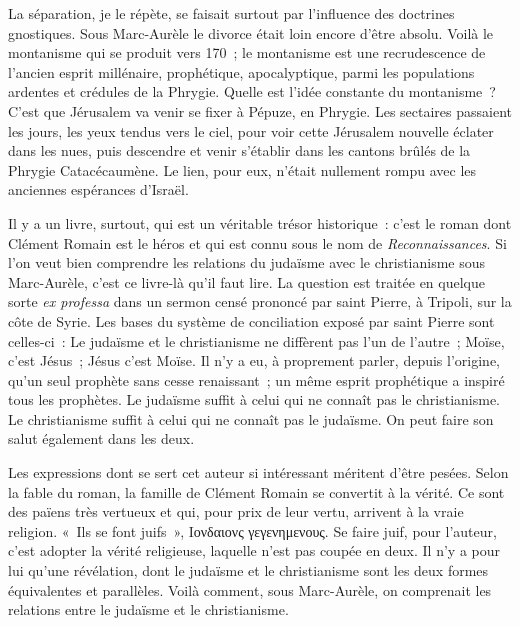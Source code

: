 \documentclass[french,twoside]{book} %
\newcommand\orgName[1]{#1}
\newcommand\persName[1]{#1}
\newcommand\placeName[1]{#1}
\begin{document}
La séparation, je le répète, se faisait surtout par l’influence des doctrines gnostiques. Sous {\persName Marc-Aurèle} le divorce était loin encore d’être absolu. Voilà le montanisme qui se produit vers 170 ; le montanisme est une recrudescence de l’ancien esprit millénaire, prophétique, apocalyptique, parmi les populations ardentes et crédules de la {\placeName Phrygie}. Quelle est l’idée constante du montanisme ? C’est que {\orgName Jérusalem} va venir se fixer à {\placeName Pépuze}, en {\placeName Phrygie}. Les sectaires passaient les jours, les yeux tendus vers le ciel, pour voir cette {\orgName Jérusalem} nouvelle éclater dans les nues, puis descendre et venir s’établir dans les cantons brûlés de la {\placeName Phrygie Catacécaumène}. Le lien, pour eux, n’était nullement rompu avec les anciennes espérances d’{\orgName Israël}.\par
Il y a un livre, surtout, qui est un véritable trésor historique : c’est le roman dont Clément Romain est le héros et qui est connu sous le nom de \emph{Reconnaissances}. Si l’on veut bien comprendre les relations du judaïsme avec le christianisme sous {\persName Marc-Aurèle}, c’est ce livre-là qu’il faut lire. La question est traitée en quelque sorte {\itshape ex professa} dans un sermon censé prononcé par {\persName saint Pierre}, à {\placeName Tripoli}, sur la côte de {\placeName Syrie}. Les bases du système de conciliation exposé par {\persName saint Pierre} sont celles-ci : Le judaïsme et le christianisme ne diffèrent pas l’un de l’autre ; {\persName Moïse}, c’est {\persName Jésus} ; {\persName Jésus} c’est {\persName Moïse}. Il n’y a eu, à proprement parler, depuis l’origine, qu’un seul prophète sans cesse renaissant ; un même esprit prophétique a inspiré tous les prophètes. Le judaïsme suffit à celui qui ne connaît pas le christianisme. Le christianisme suffit à celui qui ne connaît pas le judaïsme. On peut faire son salut également dans les deux.\par
Les expressions dont se sert cet auteur si intéressant méritent d’être pesées. Selon la fable du roman, la famille de {\persName Clément Romain} se convertit à la vérité. Ce sont des païens très vertueux et qui, pour prix de leur vertu, arrivent à la vraie religion. « Ils se font juifs », Ιονδαιονς γεγενημενους. Se faire juif, pour l’auteur, c’est adopter la vérité religieuse, laquelle n’est pas coupée en deux. Il n’y a pour lui qu’une révélation, dont le judaïsme et le christianisme sont les deux formes équivalentes et parallèles. Voilà comment, sous {\persName Marc-Aurèle}, on comprenait les relations entre le judaïsme et le christianisme.\par
\end{document}
